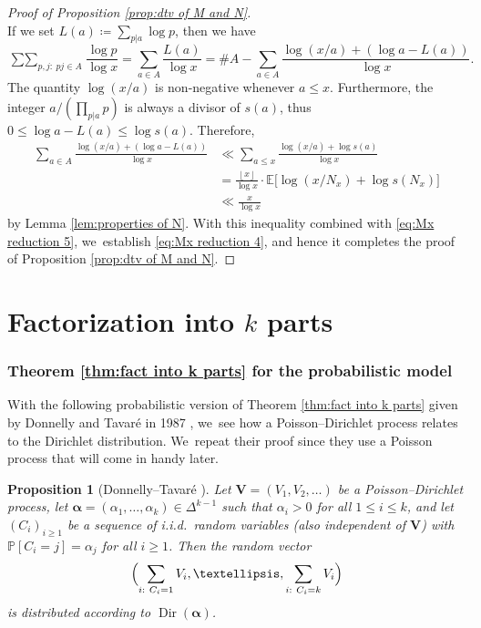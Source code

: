 \documentclass[11pt]{article}
\newcommand{\bV}{{\boldsymbol V}}
\newcommand{\PP}{\mathbb{P}}
\newcommand{\EE}{\mathbb{E}}
\newcommand{\boldalpha}{\boldsymbol{\alpha}}
\newcommand{\floor}[1]{\left\lfloor #1 \right\rfloor}
\newcommand{\simplex}{\Delta^{k-1}}
\newcommand{\bg}{\big}
\DeclareMathOperator{\Dir}{Dir}
\theoremstyle{plain}
\newtheorem{prop}[cor]{Proposition}
\theoremstyle{definition}
\begin{document}
\begin{proof}[Proof of Proposition \ref{prop:dtv of M and N}]
\begin{equation}
\end{equation}
If we set $L(a)\coloneqq \sum_{p|a}\log p$, then we have
\begin{equation}
\label{eq:Mx reduction 5}
\mathop{\sum\sum}_{p,j:\ pj \in A} \frac{\log p}{\log x} = \sum_{a\in A}\frac{L(a)}{\log x} = \# A
- \sum_{a\in A} \frac{\log(x/a) + (\log a - L(a))}{\log x}.
\end{equation}
The quantity $\log(x/a)$ is non-negative whenever $a \le x$. Furthermore, the integer $a/(\prod_{p|a} p)$ is always a divisor of $s(a)$, thus $0 \le \log a - L(a) \le \log s(a)$. Therefore,
\begin{align*}
\sum_{a\in A} \frac{\log(x/a) + (\log a - L(a))}{\log x} &\ll \sum_{a\le x} \frac{\log(x/a) + \log s(a)}{\log x} \\
&= \frac{\floor x}{\log x} \cdot \EE\bg[\log(x/N_x) + \log s(N_x)\bg] \\
&\ll \frac{x}{\log x}
\end{align*}
by Lemma \ref{lem:properties of N}. With this inequality combined with \eqref{eq:Mx reduction 5}, we~establish \eqref{eq:Mx reduction 4}, and hence it completes the proof of Proposition \ref{prop:dtv of M and N}.
\end{proof}

\part{Factorization into \texorpdfstring{$k$}{k} parts}\label{part:DDT}

\section{Theorem \ref{thm:fact into k parts} for the probabilistic model}\label{sec:Donnelly-Tavare}

With the following probabilistic version of Theorem \ref{thm:fact into k parts} given by Donnelly and Tavaré in 1987 \cite[\S 3]{DonnellyTavare87}, we~see how a Poisson--Dirichlet process relates to the Dirichlet distribution. We~repeat their proof since they use a Poisson process that will come in handy later.

\begin{prop}[Donnelly--Tavaré \cite{DonnellyTavare87}]
\label{prop:probabilistic dirichlet law}
Let $\bV = (V_1, V_2, \ldots)$ be a Poisson--Dirichlet process, let $\boldalpha = (\alpha_1, \ldots, \alpha_k) \in \simplex$ such that $\alpha_i > 0$ for all $1 \le i \le k$, and let $(C_i)_{i \ge 1}$ be a sequence of i.i.d.~random variables (also independent of $\bV$) with $\PP[C_i = j] = \alpha_j$ for all $i \ge 1$. Then the random vector
\[
\Bigl(\sum_{i:\ C_i = 1} V_i, \ldots, \sum_{i:\ C_i = k} V_i\Bigr)
\]
is distributed according to $\Dir(\boldalpha)$.
\end{prop}
\end{document}
